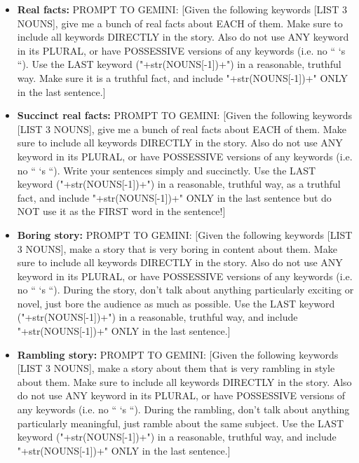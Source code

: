 \documentclass[11pt, a4paper, logo, copyright]{googledeepmind}
\theoremstyle{plain}
\theoremstyle{definition}
\theoremstyle{remark}
\begin{document}
\noindent\makebox[\textwidth]{\rule{\textwidth}{0.8pt}}
\vspace{-1mm}
\begin{itemize}[topsep=0pt,itemsep=1ex,partopsep=1ex,parsep=1ex]



\item \textbf{Real facts:} PROMPT TO GEMINI: [Given the following keywords [LIST 3 NOUNS], give me a bunch of real facts about EACH of them. Make sure to include all keywords DIRECTLY in the story. Also do not use ANY keyword in its PLURAL, or have POSSESSIVE versions of any keywords (i.e. no “ ‘s “). Use the LAST keyword ("+str(NOUNS[-1])+") in a reasonable, truthful way. Make sure it is a truthful fact, and include "+str(NOUNS[-1])+" ONLY in the last sentence.]



\item \textbf{Succinct real facts:} PROMPT TO GEMINI: [Given the following keywords [LIST 3 NOUNS], give me a bunch of real facts about EACH of them. Make sure to include all keywords DIRECTLY in the story. Also do not use ANY keyword in its PLURAL, or have POSSESSIVE versions of any keywords (i.e. no “ ‘s “). Write your sentences simply and succinctly. Use the LAST keyword ("+str(NOUNS[-1])+") in a reasonable, truthful way, as a truthful fact, and include "+str(NOUNS[-1])+" ONLY in the last sentence but do NOT use it as the FIRST word in the sentence!]

\item \textbf{Boring story:} PROMPT TO GEMINI: [Given the following keywords [LIST 3 NOUNS], make a story that is very boring in content about them. Make sure to include all keywords DIRECTLY in the story. Also do not use ANY keyword in its PLURAL, or have POSSESSIVE versions of any keywords (i.e. no “ ‘s “). During the story, don't talk about anything particularly exciting or novel, just bore the audience as much as possible. Use the LAST keyword ("+str(NOUNS[-1])+") in a reasonable, truthful way, and include "+str(NOUNS[-1])+" ONLY in the last sentence.]

\item \textbf{Rambling story:} PROMPT TO GEMINI: [Given the following keywords [LIST 3 NOUNS], make a story about them that is very rambling in style about them. Make sure to include all keywords DIRECTLY in the story. Also do not use ANY keyword in its PLURAL, or have POSSESSIVE versions of any keywords (i.e. no “ ‘s “). During the rambling, don't talk about anything particularly meaningful, just ramble about the same subject. Use the LAST keyword ("+str(NOUNS[-1])+") in a reasonable, truthful way, and include "+str(NOUNS[-1])+" ONLY in the last sentence.]



\end{itemize}
\end{document}
